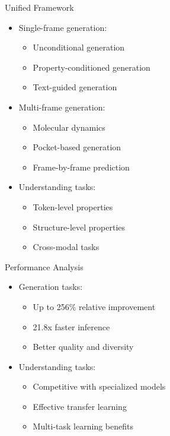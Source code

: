 \begin{frame}{Unified Framework}
    \begin{itemize}
        \item Single-frame generation:
        \begin{itemize}
            \item Unconditional generation
            \item Property-conditioned generation
            \item Text-guided generation
        \end{itemize}
        \item Multi-frame generation:
        \begin{itemize}
            \item Molecular dynamics
            \item Pocket-based generation
            \item Frame-by-frame prediction
        \end{itemize}
        \item Understanding tasks:
        \begin{itemize}
            \item Token-level properties
            \item Structure-level properties
            \item Cross-modal tasks
        \end{itemize}
    \end{itemize}
\end{frame}

\begin{frame}{Performance Analysis}
    \begin{itemize}
        \item Generation tasks:
        \begin{itemize}
            \item Up to 256\% relative improvement
            \item 21.8x faster inference
            \item Better quality and diversity
        \end{itemize}
        \item Understanding tasks:
        \begin{itemize}
            \item Competitive with specialized models
            \item Effective transfer learning
            \item Multi-task learning benefits
        \end{itemize}
    \end{itemize}
\end{frame}


